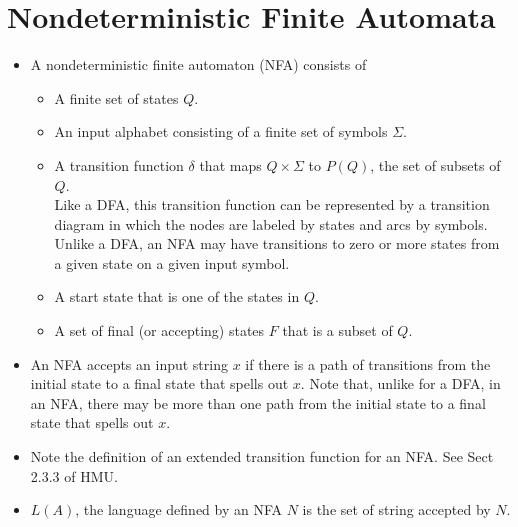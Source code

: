 \documentclass[]{article}
\begin{document}
\section{Nondeterministic Finite Automata}
  \begin{itemize}
    \item A nondeterministic finite automaton (NFA) consists of
      \begin{itemize}
        \item A finite set of states $Q$.
        \item An input alphabet consisting of a finite set of symbols
        $\Sigma$.
        \item A transition function $\delta$ that maps $Q \times \Sigma$ to
        $P(Q)$, the set of subsets of $Q$. \\
        Like a DFA, this transition function can be represented by a
        transition diagram in which the nodes are labeled by states and arcs
        by symbols. Unlike a DFA, an NFA may have transitions to zero or more
        states from a given state on a given input symbol.
        \item A start state that is one of the states in $Q$.
        \item A set of final (or accepting) states $F$ that is a subset of
        $Q$.
      \end{itemize}
    \item An NFA accepts an input string $x$ if there is a path of transitions
    from the initial state to a final state that spells out $x$. Note that,
    unlike for a DFA, in an NFA, there may be more than one path from the
    initial state to a final state that spells out $x$.
    \item Note the definition of an extended transition function for an NFA.
    See Sect 2.3.3 of HMU.
    \item $L(A)$, the language defined by an NFA $N$ is the set of string
    accepted by $N$.
  \end{itemize}
\end{document}
